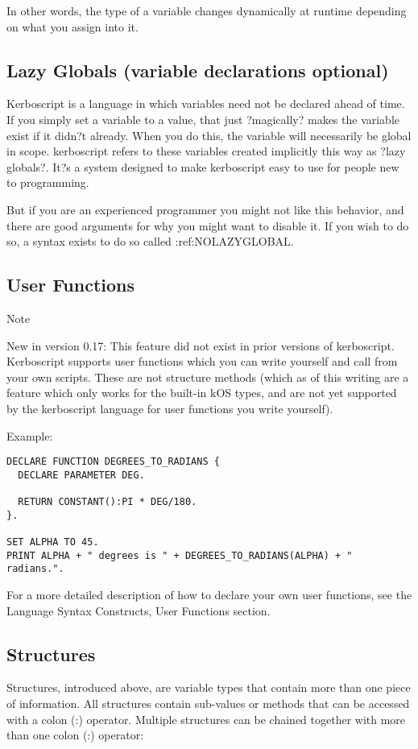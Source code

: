 In other words, the type of a variable changes dynamically at runtime depending on what you assign into it.

\subsection{Lazy Globals (variable declarations optional)}
Kerboscript is a language in which variables need not be declared ahead of time. If you simply set a variable to a value, that just ?magically? makes the variable exist if it didn?t already. When you do this, the variable will necessarily be global in scope. kerboscript refers to these variables created implicitly this way as ?lazy globals?. It?s a system designed to make kerboscript easy to use for people new to programming.

But if you are an experienced programmer you might not like this behavior, and there are good arguments for why you might want to disable it. If you wish to do so, a syntax exists to do so called :ref:NOLAZYGLOBAL.

\subsection{User Functions}
Note

New in version 0.17: This feature did not exist in prior versions of kerboscript.
Kerboscript supports user functions which you can write yourself and call from your own scripts. These are not structure methods (which as of this writing are a feature which only works for the built-in kOS types, and are not yet supported by the kerboscript language for user functions you write yourself).

Example:

\begin{Verbatim}[frame=single]
DECLARE FUNCTION DEGREES_TO_RADIANS {
  DECLARE PARAMETER DEG.

  RETURN CONSTANT():PI * DEG/180.
}.

SET ALPHA TO 45.
PRINT ALPHA + " degrees is " + DEGREES_TO_RADIANS(ALPHA) + " radians.".
\end{Verbatim}

For a more detailed description of how to declare your own user functions, see the Language Syntax Constructs, User Functions section.

\subsection{Structures}
Structures, introduced above, are variable types that contain more than one piece of information. All structures contain sub-values or methods that can be accessed with a colon (:) operator. Multiple structures can be chained together with more than one colon (:) operator:

